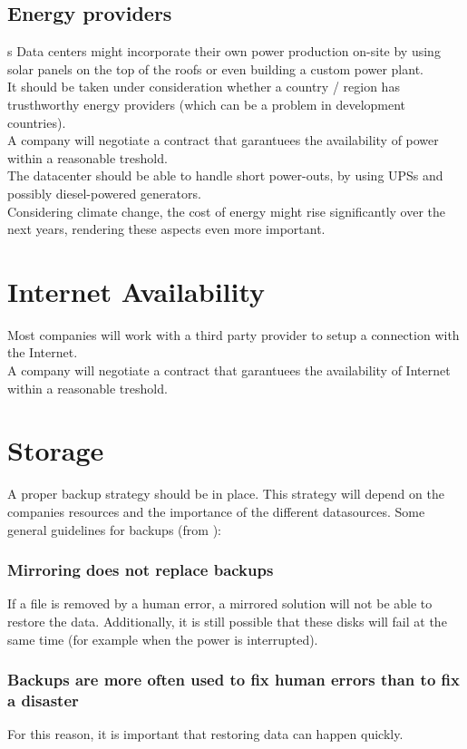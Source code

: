 \documentclass[12pt]{report}
\begin{document}
\subsection{Energy providers}
\label{energy_provider}s
Data centers might incorporate their own power production on-site by
using solar panels on the top of the roofs or even building a custom
power plant.\\
It should be taken under consideration whether a country / region has
 trusthworthy energy providers (which can be a problem in development 
countries).\\
A company will negotiate a contract that garantuees the availability of power
within a reasonable treshold.\\
The datacenter should be able to handle short power-outs, by using
UPSs and possibly diesel-powered generators.\\
Considering climate change, the cost of energy might rise
significantly over the next years, rendering these aspects even more important.

\section{Internet Availability}
Most companies will work with a third party provider to setup a
connection with the Internet. \\
A company will negotiate a contract that garantuees the availability of Internet
within a reasonable treshold.\\

\section{Storage}
A proper backup strategy should be in place. This strategy will depend
on the companies resources and the importance of the different
datasources.
Some general guidelines for backups (from \cite{ha_book}):
\subsubsection{Mirroring does not replace backups}
If a file
is removed by a human error, a mirrored solution will not be able to
restore the data.
Additionally, it is still possible that these disks will
fail at the same time
(for example when the power is interrupted).

\subsubsection{Backups are more often used to fix human errors
  than to fix a disaster}
For this reason, it is important that restoring data can happen
quickly.
\end{document}
